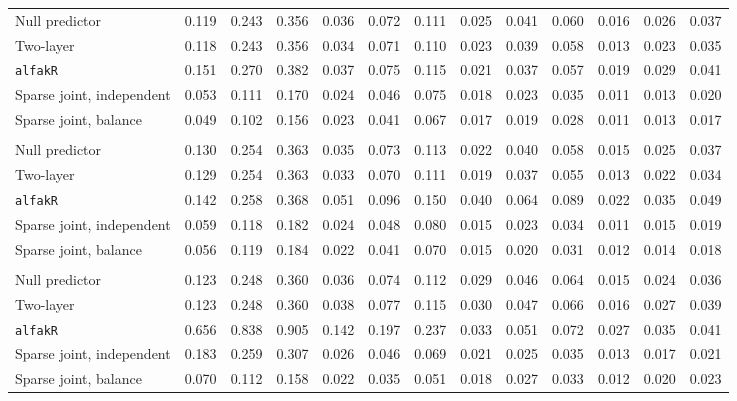 \begin{center}
\begin{tabular}{l*{12}{r}}
\quad Null predictor & 0.119 & 0.243 & 0.356 & 0.036 & 0.072 & 0.111 & 0.025 & 0.041 & 0.060 & 0.016 & 0.026 & 0.037 \\
\quad Two-layer & 0.118 & 0.243 & 0.356 & 0.034 & 0.071 & 0.110 & 0.023 & 0.039 & 0.058 & 0.013 & 0.023 & 0.035 \\
\quad \texttt{alfakR} & 0.151 & 0.270 & 0.382 & 0.037 & 0.075 & 0.115 & 0.021 & 0.037 & 0.057 & 0.019 & 0.029 & 0.041 \\
\quad Sparse joint, independent & 0.053 & 0.111 & 0.170 & 0.024 & 0.046 & 0.075 & 0.018 & 0.023 & 0.035 & 0.011 & 0.013 & 0.020 \\
\quad Sparse joint, balance & 0.049 & 0.102 & 0.156 & 0.023 & 0.041 & 0.067 & 0.017 & 0.019 & 0.028 & 0.011 & 0.013 & 0.017 \\
\addlinespace[2pt]
\multicolumn{13}{l}{\textit{100/3000, 360 d}} \\
\quad Null predictor & 0.130 & 0.254 & 0.363 & 0.035 & 0.073 & 0.113 & 0.022 & 0.040 & 0.058 & 0.015 & 0.025 & 0.037 \\
\quad Two-layer & 0.129 & 0.254 & 0.363 & 0.033 & 0.070 & 0.111 & 0.019 & 0.037 & 0.055 & 0.013 & 0.022 & 0.034 \\
\quad \texttt{alfakR} & 0.142 & 0.258 & 0.368 & 0.051 & 0.096 & 0.150 & 0.040 & 0.064 & 0.089 & 0.022 & 0.035 & 0.049 \\
\quad Sparse joint, independent & 0.059 & 0.118 & 0.182 & 0.024 & 0.048 & 0.080 & 0.015 & 0.023 & 0.034 & 0.011 & 0.015 & 0.019 \\
\quad Sparse joint, balance & 0.056 & 0.119 & 0.184 & 0.022 & 0.041 & 0.070 & 0.015 & 0.020 & 0.031 & 0.012 & 0.014 & 0.018 \\
\addlinespace[2pt]
\multicolumn{13}{l}{\textit{3000/100, 360 d}} \\
\quad Null predictor & 0.123 & 0.248 & 0.360 & 0.036 & 0.074 & 0.112 & 0.029 & 0.046 & 0.064 & 0.015 & 0.024 & 0.036 \\
\quad Two-layer & 0.123 & 0.248 & 0.360 & 0.038 & 0.077 & 0.115 & 0.030 & 0.047 & 0.066 & 0.016 & 0.027 & 0.039 \\
\quad \texttt{alfakR} & 0.656 & 0.838 & 0.905 & 0.142 & 0.197 & 0.237 & 0.033 & 0.051 & 0.072 & 0.027 & 0.035 & 0.041 \\
\quad Sparse joint, independent & 0.183 & 0.259 & 0.307 & 0.026 & 0.046 & 0.069 & 0.021 & 0.025 & 0.035 & 0.013 & 0.017 & 0.021 \\
\quad Sparse joint, balance & 0.070 & 0.112 & 0.158 & 0.022 & 0.035 & 0.051 & 0.018 & 0.027 & 0.033 & 0.012 & 0.020 & 0.023 \\
\bottomrule
\end{tabular}
\end{center}

